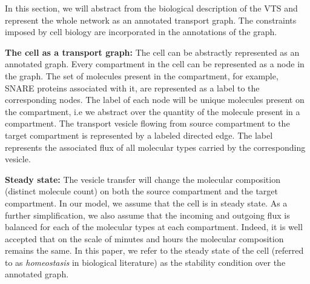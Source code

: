 
In this section, we will abstract from the biological description of the VTS and represent the whole network as an annotated transport graph. 
%
The constraints imposed by cell biology are incorporated in the  annotations of the graph. 

\textbf{The cell as a transport graph:} 
The cell can be abstractly represented as an annotated graph. 
Every compartment in the cell can be represented as a node in the graph. 
%
The set of molecules present in the compartment, for example, SNARE proteins associated with it, are represented as a label to the corresponding nodes.
%
The label of each node will be unique molecules present on the compartment, i.e we abstract over the quantity of the molecule present in a compartment.
%
The transport vesicle flowing from source compartment to the target compartment is represented by a labeled directed edge. 
% 
The label represents the associated flux of all molecular types carried by the corresponding vesicle.
%
%

\textbf{Steady state:} 
The vesicle transfer will change the molecular composition (distinct molecule count) on both the source compartment and the target compartment. 
%
In our model, we assume that the cell is in steady state. As a further simplification, we also assume that the incoming and outgoing flux is balanced for each of the molecular types at each compartment. 
Indeed, it is well accepted that on the scale of minutes and hours the molecular composition remains the same. 
%
In this paper, we refer to the steady state of the cell (referred to as \textit{homeostasis} in biological literature) as the stability condition over the annotated graph.



